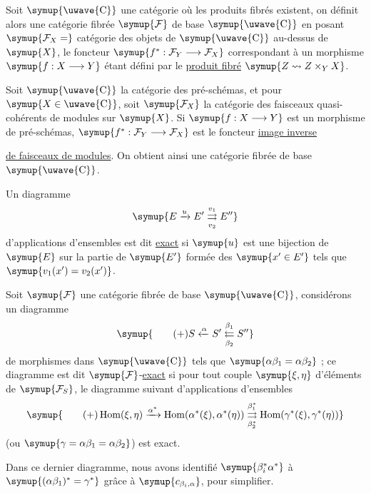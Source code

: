  Soit $\symup{\text{\uwave{C}}}$ une catégorie où les produits fibrés
existent, on définit alors une catégorie fibrée $\symup{\mathcal F}$ de base
$\symup{\text{\uwave{C}}}$ en posant $\symup{\mathcal F_X=}$ catégorie des objets de $\symup{\text{\uwave{C}}}$
au-dessus de $\symup{X}$, le foncteur
$\symup{f^*:\mathcal F_Y\longrightarrow\mathcal F_X}$ correspondant à un morphisme
$\symup{f:X\longrightarrow Y}$ étant défini par le \uline{produit fibré}
$\symup{Z\rightsquigarrow Z\times_YX}$.

 Soit $\symup{\text{\uwave{C}}}$ la catégorie des pré-schémas, et pour
$\symup{X\in\text{\uwave{C}}}$, soit $\symup{\mathcal F_X}$ la catégorie des faisceaux
quasi-cohérents de modules sur $\symup{X}$. Si $\symup{f:X\longrightarrow Y}$ est un morphisme
de pré-schémas, $\symup{f^*:\mathcal F_Y\longrightarrow\mathcal F_X}$ est le foncteur
\uline{image inverse}

\uline{de faisceaux de modules}. On obtient ainsi une catégorie fibrée de base
$\symup{\text{\uwave{C}}}$.

 Un diagramme
\[
  \symup{E\xrightarrow{u}E'
  \overset{v_1}{\underset{v_2}{\rightrightarrows}}E''}
\]
d'applications d'ensembles est dit \uline{exact} si $\symup{u}$ est une bijection de
$\symup{E}$ sur la partie de $\symup{E'}$ formée des $\symup{x'\in E'}$ tels que
$\symup{v_1(x')=v_2(x')}$.

 Soit $\symup{\mathcal F}$ une catégorie fibrée de base
$\symup{\text{\uwave{C}}}$, considérons un diagramme
\[
  \symup{\tag{+}
  S\xleftarrow{\alpha}S'
  \overset{\beta_1}{\underset{\beta_2}{\leftleftarrows}}S''}
\]
de morphismes dans $\symup{\text{\uwave{C}}}$ tels que
$\symup{\alpha\beta_1=\alpha\beta_2}$ ; ce diagramme est dit
$\symup{\mathcal F}$-\uline{exact} si pour tout couple $\symup{\xi,\eta}$ d'éléments de
$\symup{\mathcal F_S}$, le diagramme suivant d'applications d'ensembles
\[
  \symup{\tag{+}
  \operatorname{Hom}(\xi,\eta)
  \xrightarrow{\alpha^*}
  \operatorname{Hom}(\alpha^*(\xi),\alpha^*(\eta))
  \overset{\beta_1^*}{\underset{\beta_2^*}{\rightrightarrows}}
  \operatorname{Hom}(\gamma^*(\xi),\gamma^*(\eta))}
\]
(ou $\symup{\gamma=\alpha\beta_1=\alpha\beta_2}$) est exact.

Dans ce dernier
diagramme, nous avons identifié $\symup{\beta_i^*\alpha^*}$ à
$\symup{(\alpha\beta_1)^*=\gamma^*}$ grâce à $\symup{c_{\beta_i,\alpha}}$, pour simplifier.

